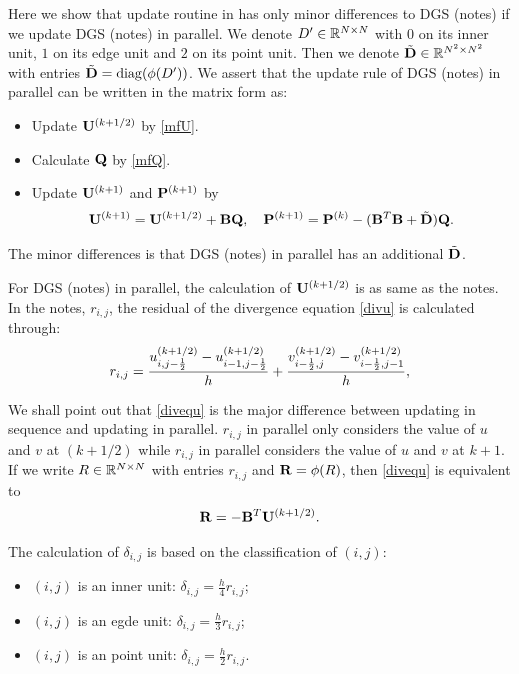 \documentclass[english]{pkupaper}
\newenvironment{eqt}{\begin{equation}\begin{aligned}}{\end{aligned}\end{equation}}
\begin{document}
Here we show that update routine in \cite{mmfts} has only minor differences to DGS (notes) if we update DGS (notes) in parallel. We denote $D'\in\mathbb{R}^{N\times N}$ with $0$ on its inner unit, $1$ on its edge unit and $2$ on its point unit. Then we denote $\tilde {\mathbf{D}}\in \mathbb{R}^{N^2\times N^2}$ with entries $\tilde {\mathbf{D}}=\mathrm{diag}(\phi(D'))$. We assert that the update rule of DGS (notes) in parallel can be written in the matrix form as: 
\begin{itemize}
\item Update $\mathbf{U}^{(k+1/2)}$ by \ref{mfU}.
\item Calculate $\mathbf{Q}$ by \ref{mfQ}.
\item Update $\mathbf{U}^{(k+1)}$ and $\mathbf{P}^{(k+1)}$ by
\begin{eqt}
\label{dgsp}
\mfU^{(k+1)}=\mfU^{(k+1/2)}+\mfB\mfQ, \quad \mfP^{(k+1)}=\mfP^{(k)}-(\mfB^T\mfB+\tilde \mfD)\mfQ.
\end{eqt}
\end{itemize}
The minor differences is that DGS (notes) in parallel has an additional $\tilde{\mathbf{D}}$.

For DGS (notes) in parallel, the calculation of $\mathbf{U}^{(k+1/2)}$ is as same as the notes. In the notes, $r_{i,j}$, the residual of the divergence equation \ref{divu} is calculated through:
\begin{eqt}
\label{divequ}
r_{i,j}=\frac{u^{(k+1/2)}_{i,j-\oot}-u^{(k+1/2)}_{i-1,j-\oot}}{h}+\frac{v^{(k+1/2)}_{i-\oot,j}-v^{(k+1/2)}_{i-\oot,j-1}}{h},
\end{eqt}

We shall point out that \ref{divequ}  is the major difference between updating in sequence and updating in parallel. $r_{i,j}$ in parallel only considers the value of $u$ and $v$ at $(k+1/2)$ while $r_{i,j}$ in parallel considers the value of $u$ and $v$ at $k+1$. If we write $R\in \mathbb{R}^{N\times N}$ with entries $r_{i,j}$ and $\mathbf{R}=\phi(R)$, then \ref{divequ} is equivalent to
\begin{eqt}
\label{mfR}
\mfR=-\mfB^T\mfU^{(k+1/2)}.
\end{eqt}

The calculation of $\delta_{i,j}$ is based on the classification of $(i,j)$:
\begin{itemize}
\item $(i,j)$ is an inner unit: $\delta_{i,j}=\frac{h}{4}r_{i,j}$; 
\item $(i,j)$ is an egde unit: $\delta_{i,j}=\frac{h}{3}r_{i,j}$; 
\item $(i,j)$ is an point unit: $\delta_{i,j}=\frac{h}{2}r_{i,j}$.
\end{itemize}
\end{document}
